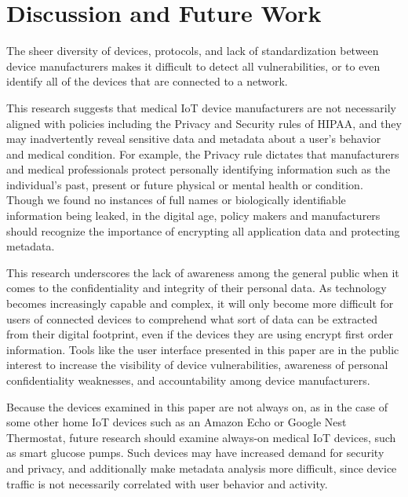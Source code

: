 
\section{Discussion and Future Work}

The sheer diversity of devices, protocols, and lack of standardization between device manufacturers makes it difficult to detect all vulnerabilities, or to even identify all of the devices that are connected to a network.

This research suggests that medical IoT device manufacturers are not necessarily aligned with policies including the Privacy and Security rules of HIPAA, and they may inadvertently reveal sensitive data and metadata about a user's behavior and medical condition. For example, the Privacy rule dictates that manufacturers and medical professionals protect personally identifying information such as the individual's past, present or future physical or mental health or condition. Though we found no instances of full names or biologically identifiable information being leaked, in the digital age, policy makers and manufacturers should recognize the importance of encrypting all application data and protecting metadata.

This research underscores the lack of awareness among the general public when it comes to the confidentiality and integrity of their personal data. As technology becomes increasingly capable and complex, it will only become more difficult for users of connected devices to comprehend what sort of data can be extracted from their digital footprint, even if the devices they are using encrypt first order information. Tools like the user interface presented in this paper are in the public interest to increase the visibility of device vulnerabilities, awareness of personal confidentiality weaknesses, and accountability among device manufacturers.

Because the devices examined in this paper are not always on, as in the case
of some other home IoT devices such as an Amazon Echo or Google Nest
Thermostat, future research should examine always-on medical IoT devices, such
as smart glucose pumps. Such devices may have increased demand for security
and privacy, and additionally make metadata analysis more difficult, since
device traffic is not necessarily correlated with user behavior and activity.

